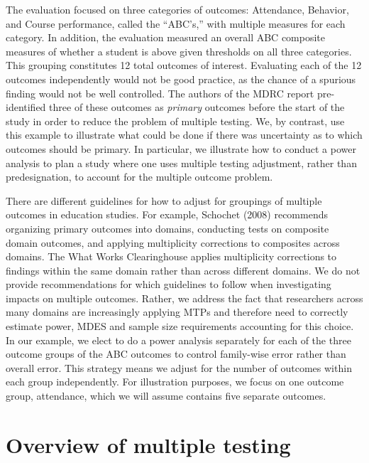 \documentclass[
]{article}
\begin{document}
The evaluation focused on three categories of outcomes: Attendance,
Behavior, and Course performance, called the ``ABC's,'' with multiple
measures for each category. In addition, the evaluation measured an
overall ABC composite measures of whether a student is above given
thresholds on all three categories. This grouping constitutes 12 total
outcomes of interest. Evaluating each of the 12 outcomes independently
would not be good practice, as the chance of a spurious finding would
not be well controlled. The authors of the MDRC report pre-identified
three of these outcomes as \emph{primary} outcomes before the start of
the study in order to reduce the problem of multiple testing. We, by
contrast, use this example to illustrate what could be done if there was
uncertainty as to which outcomes should be primary. In particular, we
illustrate how to conduct a power analysis to plan a study where one
uses multiple testing adjustment, rather than predesignation, to account
for the multiple outcome problem.

There are different guidelines for how to adjust for groupings of
multiple outcomes in education studies. For example, Schochet (2008)
recommends organizing primary outcomes into domains, conducting tests on
composite domain outcomes, and applying multiplicity corrections to
composites across domains. The What Works Clearinghouse applies
multiplicity corrections to findings within the same domain rather than
across different domains. We do not provide recommendations for which
guidelines to follow when investigating impacts on multiple outcomes.
Rather, we address the fact that researchers across many domains are
increasingly applying MTPs and therefore need to correctly estimate
power, MDES and sample size requirements accounting for this choice. In
our example, we elect to do a power analysis separately for each of the
three outcome groups of the ABC outcomes to control family-wise error
rather than overall error. This strategy means we adjust for the number
of outcomes within each group independently. For illustration purposes,
we focus on one outcome group, attendance, which we will assume contains
five separate outcomes.

\section{Overview of multiple testing}
\label{sec:mtp_overview}
\end{document}
